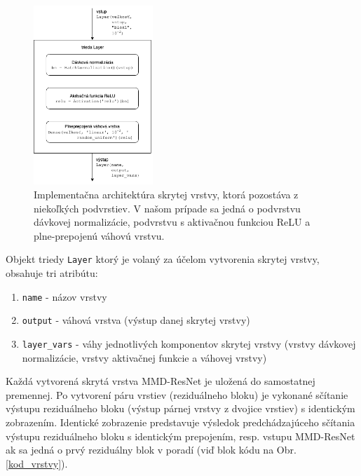 \begin{figure}
\centerline{\includegraphics[width=0.4\textwidth]{images/skryta_vrstva.png}}
\caption[Implementačná architektúra skrytej vrstvy]{Implementačna architektúra skrytej vrstvy, ktorá pozostáva z niekoľkých podvrstiev. V našom prípade sa jedná o podvrstvu dávkovej normalizácie, podvrstvu s aktivačnou funkciou ReLU a plne-prepojenú váhovú vrstvu.}
\label{impl_vrstva}
\end{figure}

Objekt triedy \texttt{Layer} ktorý je volaný za účelom vytvorenia skrytej vrstvy, obsahuje tri atribútu:
\begin{enumerate}
    \item \texttt{name} - názov vrstvy
    \item \texttt{output} - váhová vrstva (výstup danej skrytej vrstvy)
    \item \texttt{layer_vars} - váhy jednotlivých komponentov skrytej vrstvy (vrstvy dávkovej normalizácie, vrstvy aktivačnej funkcie a váhovej vrstvy)
\end{enumerate}

Každá vytvorená skrytá vrstva MMD-ResNet je uložená do samostatnej premennej. Po vytvorení páru vrstiev (reziduálneho bloku) je vykonané sčítanie výstupu reziduálneho bloku (výstup párnej vrstvy z dvojice vrstiev) s identickým zobrazením. Identické zobrazenie predstavuje výsledok predchádzajúceho sčítania výstupu reziduálneho bloku s identickým prepojením, resp. vstupu MMD-ResNet ak sa jedná o prvý reziduálny blok v poradí (viď blok kódu na Obr. \ref{kod_vrstvy}). 

